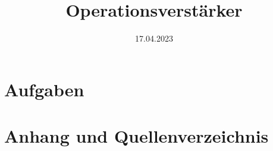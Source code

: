 
\title{Operationsverstärker}
\date{17.04.2023}

    \maketitle
    \newpage
    
    
    \newpage
    \part{Aufgaben}
    
    \newpage
    
    
    \newpage
    \part{Anhang und Quellenverzeichnis}
    \printbibliography[heading=bibnumbered,title=Referenzen und Literatur]
    
